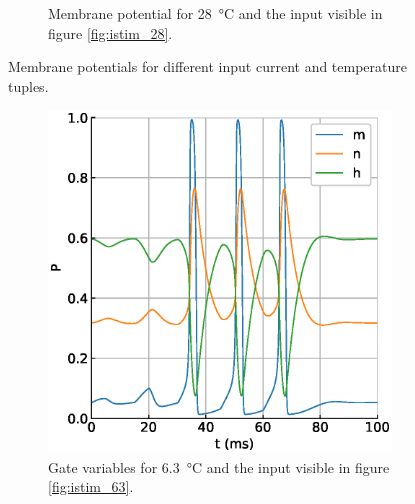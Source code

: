 \documentclass{scrartcl}			%
\begin{document}
\begin{figure}[H]
\begin{subfigure}[b]{0.5\linewidth}
    \caption{Membrane potential for \SI{28}{\celsius} and the input visible in figure \ref{fig:istim_28}.} 
    \label{fig:vmem_28} 
    \end{subfigure} 
  \caption{Membrane potentials for different input current and temperature tuples.}
  \label{fig:vmembrane} 
\end{figure}

\begin{figure}[H] 
  \begin{subfigure}[b]{0.5\linewidth}
    \centering
    \includegraphics[width=\linewidth]{imgs/gates_at_6.eps} 
    \caption{Gate variables for \SI{6.3}{\celsius} and the input visible in figure \ref{fig:istim_63}.} 
    \label{fig:gates_63} 
  \end{subfigure}%
  \quad
  \begin{subfigure}[b]{0.5\linewidth}
    \centering

\end{subfigure}
\end{figure}
\end{document}
